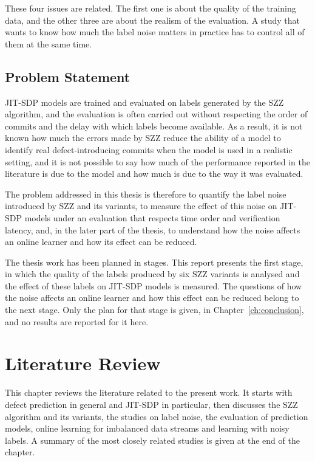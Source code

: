 \documentclass[12pt,a4paper,oneside]{report}
\begin{document}
These four issues are related. The first one is about the quality of the
training data, and the other three are about the realism of the evaluation.
A study that wants to know how much the label noise matters in practice has to
control all of them at the same time.

\section{Problem Statement}

JIT-SDP models are trained and evaluated on labels generated by the SZZ
algorithm, and the evaluation is often carried out without respecting the
order of commits and the delay with which labels become available. As a
result, it is not known how much the errors made by SZZ reduce the ability of
a model to identify real defect-introducing commits when the model is used in
a realistic setting, and it is not possible to say how much of the performance
reported in the literature is due to the model and how much is due to the way
it was evaluated.

The problem addressed in this thesis is therefore to quantify the label noise
introduced by SZZ and its variants, to measure the effect of this noise on
JIT-SDP models under an evaluation that respects time order and verification
latency, and, in the later part of the thesis, to understand how the noise
affects an online learner and how its effect can be reduced.

The thesis work has been planned in stages. This report presents the first
stage, in which the quality of the labels produced by six SZZ variants is
analysed and the effect of these labels on JIT-SDP models is measured. The
questions of how the noise affects an online learner and how this effect can
be reduced belong to the next stage. Only the plan for that stage is given, in
Chapter~\ref{ch:conclusion}, and no results are reported for it here.

\chapter{Literature Review}\label{ch:lit}

This chapter reviews the literature related to the present work. It starts
with defect prediction in general and JIT-SDP in particular, then discusses
the SZZ algorithm and its variants, the studies on label noise, the evaluation
of prediction models, online learning for imbalanced data streams and learning
with noisy labels. A summary of the most closely related studies is given at
the end of the chapter.
\end{document}
